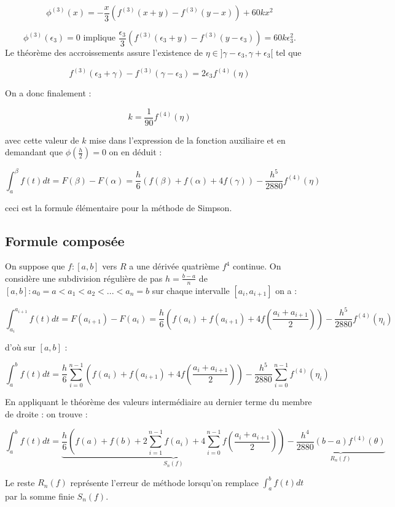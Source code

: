 \[
\phi^{(3)}(x) = -\frac{x}{3}(f^{(3)}(x+y)-f^{(3)}(y-x))+60kx^2
\]

\[
\phi^{(3)}(\epsilon_3) = 0 \text{ implique } \frac{\epsilon_3}{3}(f^{(3)}(\epsilon_3+y)-f^{(3)}(y-\epsilon_3))=60k\epsilon_3^2.
\]
Le théorème des accroissements assure l'existence de \(\eta \in ]\gamma - \epsilon_3, \gamma + \epsilon_3[\) tel que

\[
f^{(3)}(\epsilon_3+\gamma)-f^{(3)}(\gamma-\epsilon_3)=2\epsilon_3f^{(4)}(\eta)
\]

On a donc finalement :

\[
k = \frac{1}{90}f^{(4)}(\eta)
\]

avec cette valeur de \(k\) mise dans l'expression de la fonction auxiliaire et en demandant que \(\phi(\frac{h}{2}) = 0\) on en déduit :

\[
\displaystyle\int_a^\beta f(t)dt = F(\beta)-F(\alpha) = \frac{h}{6}(f(\beta)+f(\alpha)+4f(\gamma))-\frac{h^5}{2880}f^{(4)}(\eta)
\]

ceci est la formule élémentaire pour la méthode de Simpson.

\subsection{Formule composée}
On suppose que \(f: [a,b]\) vers \(R\) a une dérivée quatrième \(f^4\) continue. On considère une subdivision régulière de pas \(h = \frac{b-a}{n}\) de \([a,b]: a_0 = a < a_1 < a_2 < ... < a_n = b\) sur chaque intervalle \([a_i,a_{i+1}]\) on a :

\[
\displaystyle\int_{a_i}^{a_{i+1}} f(t)dt = F(a_{i+1})-F(a_i) = \frac{h}{6}(f(a_i)+f(a_{i+1})+4f\left(\frac{a_i+a_{i+1}}{2}\right))-\frac{h^5}{2880}f^{(4)}(\eta_i)
\]

d'où sur \([a,b]\) :

\[
\displaystyle\int_a^b f(t)dt = \frac{h}{6} \displaystyle\sum_{i=0}^{n-1} (f(a_i) + f(a_{i+1}) + 4f\left(\frac{a_i + a_{i+1}}{2}\right)) - \frac{h^5}{2880} \displaystyle\sum_{i=0}^{n-1} f^{(4)} (\eta_i)
\]

En appliquant le théorème des valeurs intermédiaire au dernier terme du membre de droite : on trouve :

\[
\displaystyle\int_a^b f(t)dt =  \underbrace{\frac{h}{6} \left(f(a) + f(b) + 2 \displaystyle\sum_{i=1}^{n-1} f(a_i) + 4 \displaystyle\sum_{i=0}^{n-1} f\left(\frac{a_i + a_{i+1}}{2}\right)\right)}_{S_n(f)}  - \underbrace{\frac{h^4}{2880} \left( b - a \right) f^{(4)} (\theta)}_{R_{n}(f)}
\]

Le reste \( R_n(f) \) représente l'erreur de méthode lorsqu'on remplace \(\displaystyle\int_a^b f(t)dt\) par la somme finie \( S_n(f) \).

